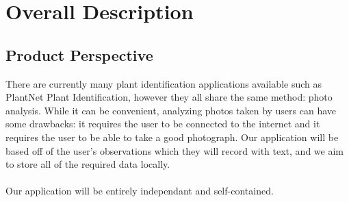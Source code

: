 \documentclass[]{article}
\begin{document}

\section{Overall Description}
\label{sec:overall_description}

\subsection{Product Perspective}
\label{sub:product_perspective}
There are currently many plant identification applications available such as PlantNet Plant Identification, however they all share the same method: photo analysis. While it can be convenient, analyzing photos taken by users can have some drawbacks: it requires the user to be connected to the internet and it requires the user to be able to take a good photograph. Our application will be based off of the user's observations which they will record with text, and we aim to store all of the required data locally. \\ \\
Our application will be entirely independant and self-contained.

\end{document}
